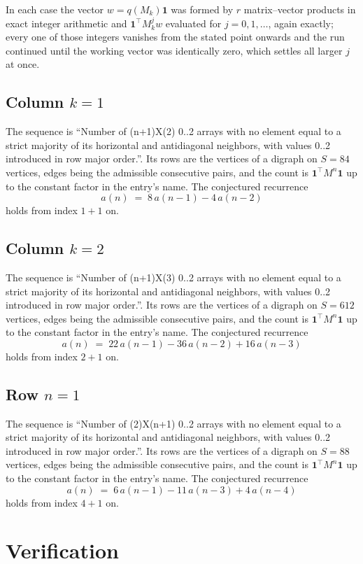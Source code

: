 \documentclass[11pt,a4paper]{article}
\theoremstyle{plain}
\theoremstyle{definition}
\begin{document}
In each case the vector $w=q(M_k)\mathbf{1}$ was formed by $r$ matrix--vector products in
exact integer arithmetic and $\mathbf{1}^{\!\top}M_k^{j}w$ evaluated for $j=0,1,\dots$,
again exactly; every one of those integers vanishes from the stated point onwards and the run
continued until the working vector was identically zero, which settles all larger $j$ at once.

\subsection*{Column $k$$=1$}
The sequence is ``Number of (n+1)X(2) 0..2 arrays with no element equal to a strict majority of its horizontal and antidiagonal neighbors, with values 0..2 introduced in row major order.''. Its rows are the vertices of a digraph on
$S=84$ vertices, edges being the admissible consecutive pairs, and the count is
$\mathbf{1}^{\!\top}M^{n}\mathbf{1}$ up to the constant factor in the entry's name.
The conjectured recurrence
\[
a(n)\;=\;8\,a(n-1) - 4\,a(n-2)
\]
holds from index $1+1$ on.

\subsection*{Column $k$$=2$}
The sequence is ``Number of (n+1)X(3) 0..2 arrays with no element equal to a strict majority of its horizontal and antidiagonal neighbors, with values 0..2 introduced in row major order.''. Its rows are the vertices of a digraph on
$S=612$ vertices, edges being the admissible consecutive pairs, and the count is
$\mathbf{1}^{\!\top}M^{n}\mathbf{1}$ up to the constant factor in the entry's name.
The conjectured recurrence
\[
a(n)\;=\;22\,a(n-1) - 36\,a(n-2) + 16\,a(n-3)
\]
holds from index $2+1$ on.

\subsection*{Row $n$$=1$}
The sequence is ``Number of (2)X(n+1) 0..2 arrays with no element equal to a strict majority of its horizontal and antidiagonal neighbors, with values 0..2 introduced in row major order.''. Its rows are the vertices of a digraph on
$S=88$ vertices, edges being the admissible consecutive pairs, and the count is
$\mathbf{1}^{\!\top}M^{n}\mathbf{1}$ up to the constant factor in the entry's name.
The conjectured recurrence
\[
a(n)\;=\;6\,a(n-1) - 11\,a(n-3) + 4\,a(n-4)
\]
holds from index $4+1$ on.

\section{Verification}
\end{document}
